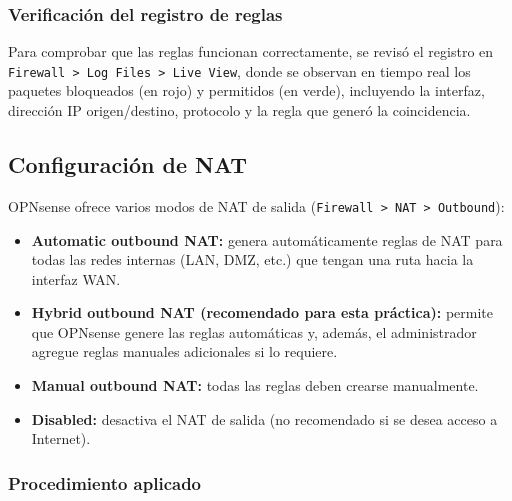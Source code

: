 \documentclass{article}
\providecommand{\tightlist}{%
  \setlength{\itemsep}{0pt}\setlength{\parskip}{0pt}}
\renewcommand{\_}{\oldunderscore\hskip0pt\relax}
\begin{document}
\hypertarget{verificaciuxf3n-del-registro-de-reglas}{%
\subsubsection{Verificación del registro de
reglas}\label{verificaciuxf3n-del-registro-de-reglas}}

Para comprobar que las reglas funcionan correctamente, se revisó el
registro en
\texttt{Firewall\ \textgreater{}\ Log\ Files\ \textgreater{}\ Live\ View},
donde se observan en tiempo real los paquetes bloqueados (en rojo) y
permitidos (en verde), incluyendo la interfaz, dirección IP
origen/destino, protocolo y la regla que generó la coincidencia.

\hypertarget{configuraciuxf3n-de-nat}{%
\subsection{Configuración de NAT}\label{configuraciuxf3n-de-nat}}

OPNsense ofrece varios modos de NAT de salida
(\texttt{Firewall\ \textgreater{}\ NAT\ \textgreater{}\ Outbound}):

\begin{itemize}
\tightlist
\item
  \textbf{Automatic outbound NAT:} genera automáticamente reglas de NAT
  para todas las redes internas (LAN, DMZ, etc.) que tengan una ruta
  hacia la interfaz WAN.
\item
  \textbf{Hybrid outbound NAT (recomendado para esta práctica):} permite
  que OPNsense genere las reglas automáticas y, además, el administrador
  agregue reglas manuales adicionales si lo requiere.
\item
  \textbf{Manual outbound NAT:} todas las reglas deben crearse
  manualmente.
\item
  \textbf{Disabled:} desactiva el NAT de salida (no recomendado si se
  desea acceso a Internet).
\end{itemize}

\hypertarget{procedimiento-aplicado}{%
\subsubsection{Procedimiento aplicado}\label{procedimiento-aplicado}}
\end{document}
